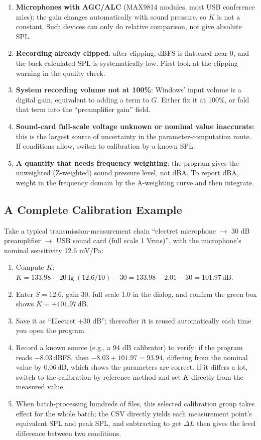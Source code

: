 \documentclass[UTF8,a4paper,12pt]{ctexart}
\begin{document}
\begin{enumerate}
  \item \textbf{Microphones with AGC/ALC} (MAX9814 modules, most USB conference mics): the gain changes automatically with sound pressure, so $K$ is not a constant. Such devices can only do relative comparison, not give absolute SPL.
  \item \textbf{Recording already clipped}: after clipping, dBFS is flattened near 0, and the back-calculated SPL is systematically low. First look at the clipping warning in the quality check.
  \item \textbf{System recording volume not at 100\%}: Windows' input volume is a digital gain, equivalent to adding a term to $G$. Either fix it at 100\%, or fold that term into the ``preamplifier gain'' field.
  \item \textbf{Sound-card full-scale voltage unknown or nominal value inaccurate}: this is the largest source of uncertainty in the parameter-computation route. If conditions allow, switch to calibration by a known SPL.
  \item \textbf{A quantity that needs frequency weighting}: the program gives the unweighted (Z-weighted) sound pressure level, not dBA. To report dBA, weight in the frequency domain by the A-weighting curve and then integrate.
\end{enumerate}

\subsection{A Complete Calibration Example}

Take a typical transmission-measurement chain ``electret microphone $\to$ 30 dB preamplifier $\to$ USB sound card (full scale 1 Vrms)'', with the microphone's nominal sensitivity 12.6 mV/Pa:

\begin{enumerate}
  \item Compute $K$: $K = 133.98 - 20\lg(12.6/10) - 30 = 133.98 - 2.01 - 30 = 101.97$\,dB.
  \item Enter $S=12.6$, gain 30, full scale 1.0 in the dialog, and confirm the green box shows $K=+101.97$\,dB.
  \item Save it as ``Electret +30 dB''; thereafter it is reused automatically each time you open the program.
  \item Record a known source (e.g., a 94 dB calibrator) to verify: if the program reads $-8.03$\,dBFS, then $-8.03+101.97=93.94$, differing from the nominal value by 0.06\,dB, which shows the parameters are correct. If it differs a lot, switch to the calibration-by-reference method and set $K$ directly from the measured value.
  \item When batch-processing hundreds of files, this selected calibration group takes effect for the whole batch; the CSV directly yields each measurement point's equivalent SPL and peak SPL, and subtracting to get $\Delta L$ then gives the level difference between two conditions.
\end{enumerate}
\end{document}
